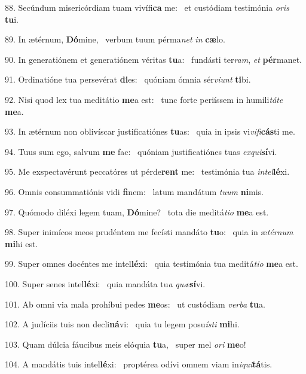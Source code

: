 88. Secúndum misericórdiam tuam vivífi\textbf{ca} me: \ast\  et custódiam testimónia \textit{o}\textit{ris} \textbf{tu}i.\

89. In ætérnum, \textbf{Dó}mine, \ast\  verbum tuum pérma\textit{net} \textit{in} \textbf{cæ}lo.\

90. In generatiónem et generatiónem véritas \textbf{tu}a: \ast\  fundásti ter\textit{ram}, \textit{et} \textbf{pér}manet.\

91. Ordinatióne tua persevérat \textbf{di}es: \ast\  quóniam ómnia sér\textit{vi}\textit{unt} \textbf{ti}bi.\

92. Nisi quod lex tua meditátio \textbf{me}a est: \ast\  tunc forte periíssem in humili\textit{tá}\textit{te} \textbf{me}a.\

93. In ætérnum non oblivíscar justificatiónes \textbf{tu}as: \ast\  quia in ipsis vi\textit{vi}\textit{fi}\textbf{cás}ti me.\

94. Tuus sum ego, salvum \textbf{me} fac: \ast\  quóniam justificatiónes tuas \textit{ex}\textit{qui}\textbf{sí}vi.\

95. Me exspectavérunt peccatóres ut pérde\textbf{rent} me: \ast\  testimónia tua \textit{in}\textit{tel}\textbf{lé}xi.\

96. Omnis consummatiónis vidi \textbf{fi}nem: \ast\  latum mandátum \textit{tu}\textit{um} \textbf{ni}mis.\

97. Quómodo diléxi legem tuam, \textbf{Dó}mine? \ast\  tota die meditá\textit{ti}\textit{o} \textbf{me}a est.\

98. Super inimícos meos prudéntem me fecísti mandáto \textbf{tu}o: \ast\  quia in æ\textit{tér}\textit{num} \textbf{mi}hi est.\

99. Super omnes docéntes me intel\textbf{lé}xi: \ast\  quia testimónia tua meditá\textit{ti}\textit{o} \textbf{me}a est.\

100. Super senes intel\textbf{lé}xi: \ast\  quia mandáta tu\textit{a} \textit{quæ}\textbf{sí}vi.\

101. Ab omni via mala prohíbui pedes \textbf{me}os: \ast\  ut custódiam \textit{ver}\textit{ba} \textbf{tu}a.\

102. A judíciis tuis non decli\textbf{ná}vi: \ast\  quia tu legem posu\textit{ís}\textit{ti} \textbf{mi}hi.\

103. Quam dúlcia fáucibus meis elóquia \textbf{tu}a, \ast\  super mel \textit{o}\textit{ri} \textbf{me}o!\

104. A mandátis tuis intel\textbf{lé}xi: \ast\  proptérea odívi omnem viam in\textit{i}\textit{qui}\textbf{tá}tis.\

